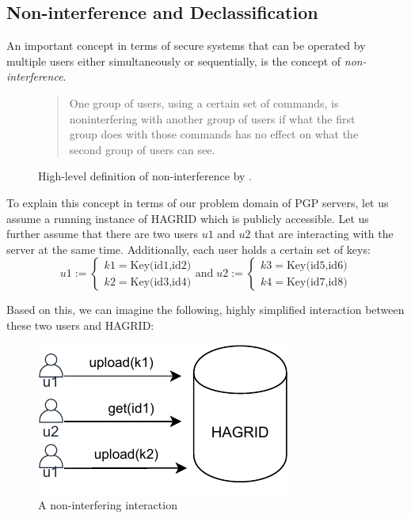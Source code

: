 \subsection{Non-interference and Declassification}
\label{ref:Declass_and_Inter}
An important concept in terms of secure systems that can be operated by multiple users either simultaneously or sequentially, is the concept of \emph{non-interference}.
\begin{figure}[H]
    \begin{quotation}
    One group of users, using a certain set of commands, is noninterfering with another group of users if what the first group does with those commands has no effect on what the second group of users can see.
    \end{quotation}
    \caption{High-level definition of non-interference by \citeauthor{Goguen_Meseguer_82}\cite{Goguen_Meseguer_82}.}
\end{figure}

To explain this concept in terms of our problem domain of PGP servers, let us assume a running instance of HAGRID which is publicly accessible. Let us further assume that there are two users \(u1\) and \(u2\) that are interacting with the server at the same time. Additionally, each user holds a certain set of keys:
\bigskip
\begin{equation}
    u1 := \begin{cases}
        k1 = \text{Key(id1,id2)} \\
        k2 = \text{Key(id3,id4)}
    \end{cases}
    \text{and} \;
    u2 := \begin{cases}
        k3 = \text{Key(id5,id6)} \\
        k4 = \text{Key(id7,id8)}
    \end{cases}
\end{equation}

Based on this, we can imagine the following, highly simplified interaction between these two users and HAGRID:
\begin{figure}[H]
    \label{fig:example}
    \centering
    \includegraphics{images/non_interference.pdf}
    \caption{A non-interfering interaction}
\end{figure}

